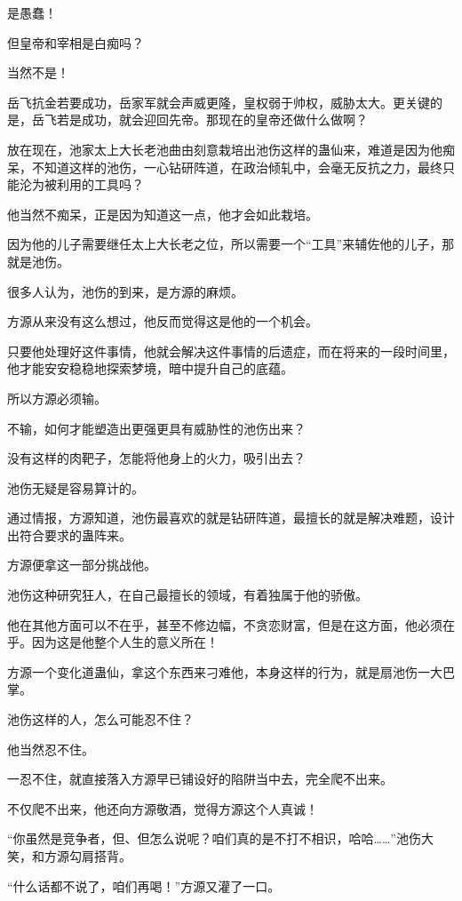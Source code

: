 \begin{this_body}
是愚蠢！

但皇帝和宰相是白痴吗？

当然不是！

岳飞抗金若要成功，岳家军就会声威更隆，皇权弱于帅权，威胁太大。更关键的是，岳飞若是成功，就会迎回先帝。那现在的皇帝还做什么做啊？

放在现在，池家太上大长老池曲由刻意栽培出池伤这样的蛊仙来，难道是因为他痴呆，不知道这样的池伤，一心钻研阵道，在政治倾轧中，会毫无反抗之力，最终只能沦为被利用的工具吗？

他当然不痴呆，正是因为知道这一点，他才会如此栽培。

因为他的儿子需要继任太上大长老之位，所以需要一个“工具”来辅佐他的儿子，那就是池伤。

很多人认为，池伤的到来，是方源的麻烦。

方源从来没有这么想过，他反而觉得这是他的一个机会。

只要他处理好这件事情，他就会解决这件事情的后遗症，而在将来的一段时间里，他才能安安稳稳地探索梦境，暗中提升自己的底蕴。

所以方源必须输。

不输，如何才能塑造出更强更具有威胁性的池伤出来？

没有这样的肉靶子，怎能将他身上的火力，吸引出去？

池伤无疑是容易算计的。

通过情报，方源知道，池伤最喜欢的就是钻研阵道，最擅长的就是解决难题，设计出符合要求的蛊阵来。

方源便拿这一部分挑战他。

池伤这种研究狂人，在自己最擅长的领域，有着独属于他的骄傲。

他在其他方面可以不在乎，甚至不修边幅，不贪恋财富，但是在这方面，他必须在乎。因为这是他整个人生的意义所在！

方源一个变化道蛊仙，拿这个东西来刁难他，本身这样的行为，就是扇池伤一大巴掌。

池伤这样的人，怎么可能忍不住？

他当然忍不住。

一忍不住，就直接落入方源早已铺设好的陷阱当中去，完全爬不出来。

不仅爬不出来，他还向方源敬酒，觉得方源这个人真诚！

“你虽然是竞争者，但、但怎么说呢？咱们真的是不打不相识，哈哈……”池伤大笑，和方源勾肩搭背。

“什么话都不说了，咱们再喝！”方源又灌了一口。


\end{this_body}
